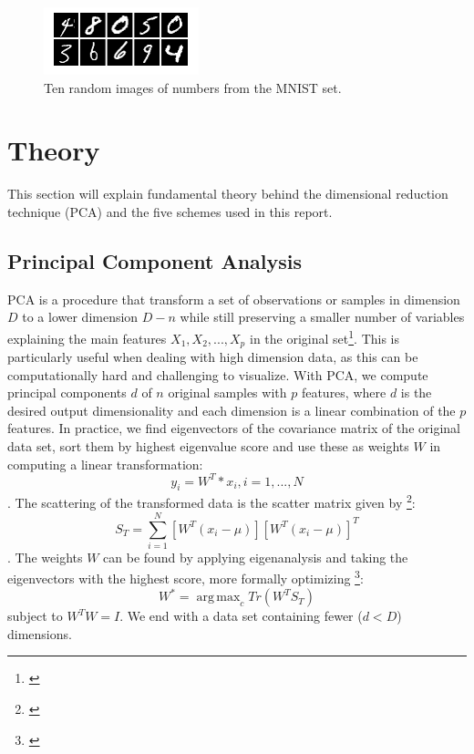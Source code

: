 \documentclass[journal]{IEEEtran}
\DeclareMathOperator*{\argmax}{arg\,max}
\begin{document}
\begin{figure}[h]
	\centering
	\includegraphics[width=0.7\linewidth]{mnistnumbers}
	\caption{Ten random images of numbers from the MNIST set.}
	\label{fig:mnistnumbers}
\end{figure}

\section{Theory}
This section will explain fundamental theory behind the dimensional reduction technique (PCA) and the five schemes used in this report.

\subsection{Principal Component Analysis}

PCA is a procedure that transform a set of observations or samples in dimension $D$ to a lower dimension $D-n$ while still preserving a smaller number of variables explaining the main features $X_{1}, X_{2}, ..., X_{p}$ in the original set\footnote{\cite{Casella}}. This is particularly useful when dealing with high dimension data, as this can be computationally hard and challenging to visualize. With PCA, we compute principal components $d$ of $n$ original samples with $p$ features, where $d$ is the desired output dimensionality and each dimension is a linear combination of the $p$ features. In practice, we find eigenvectors of the covariance matrix of the original data set, sort them by highest eigenvalue score and use these as weights $W$ in computing a linear transformation: $$y_{i} = W^T*x_{i}, i = 1, ..., N$$. The scattering of the transformed data is the scatter matrix given by \footnote{\cite{Iosifidis2017}}: $$S_{T} = \sum_{i=1}^{N} [W^T(x_{i}-\mu)][W^T(x_{i}-\mu)]^T$$. The weights $W$ can be found by applying eigenanalysis and taking the eigenvectors with the  highest score, more formally optimizing \footnote{\cite{Iosifidis2017}}: \[ W^* = \argmax_c Tr (W^TS_{T}) \] subject to $W^TW=I$. We end with a data set containing fewer ($d < D$) dimensions.
\end{document}
